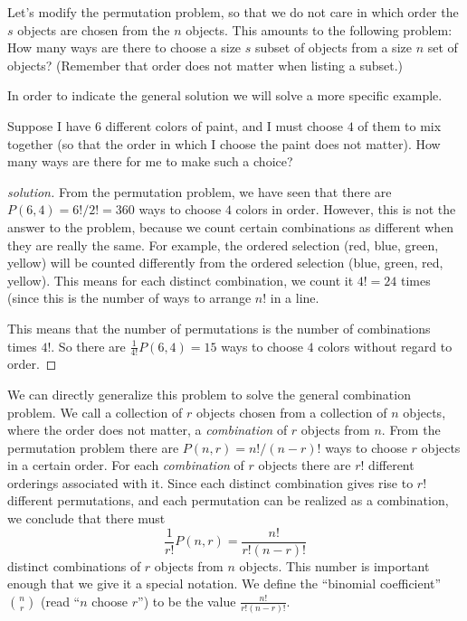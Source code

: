 Let's modify the permutation problem, so that we do not care in which order the $s$ objects are chosen from the $n$ objects. This amounts to the following problem: How many ways are there to choose a size $s$ subset of objects from a size $n$ set of objects? (Remember that order does not matter when listing a subset.)

In order to indicate the general solution we will solve a more specific example.
\begin{example}
 Suppose I have $6$ different colors of paint, and I must choose $4$ of them to mix together (so that the order in which I choose the paint does not matter). How many ways are there for me to make such a choice?
\end{example}
\begin{proof}[solution]
 From the permutation problem, we have seen that there are $P(6, 4) = 6!/2! = 360$ ways to choose $4$ colors in order. However, this is not the answer to the problem, because we count certain combinations as different when they are really the same. For example, the ordered selection (red, blue, green, yellow) will be counted differently from the ordered selection (blue, green, red, yellow). This means for each distinct combination, we count it $4! = 24$ times (since this is the number of ways to arrange $n!$ in a line.
 
 This means that the number of permutations is the number of combinations times $4!$. So there are $\frac{1}{4!}P(6,4) = 15$ ways to choose $4$ colors without regard to order.
\end{proof}

We can directly generalize this problem to solve the general combination problem. We call a collection of $r$ objects chosen from a collection of $n$ objects, where the order does not matter, a \textit{combination} of $r$ objects from $n$. From the permutation problem there are $P(n, r) = n!/(n-r)!$ ways to choose $r$ objects in a certain order. For each \textit{combination} of $r$ objects there are $r!$ different orderings associated with it. Since each distinct combination gives rise to $r!$ different permutations, and each permutation can be realized as a combination, we conclude that there must 
\[\frac{1}{r!}P(n, r) = \frac{n!}{r!(n-r)!}\]
distinct combinations of $r$ objects from $n$ objects. This number is important enough that we give it a special notation. We define the ``binomial coefficient'' $\binom{n}{r}$ (read ``$n$ choose $r$'') to be the value $\frac{n!}{r!(n-r)!}$.

